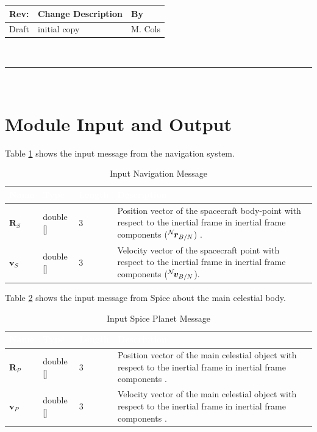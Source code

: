 \documentclass[]{AVSSimReportMemo}
\begin{document}
\makeCover


%
%
\pagestyle{empty}
{\renewcommand{\arraystretch}{2}
\noindent
\begin{longtable}{|p{0.5in}|p{4.5in}|p{1.14in}|}
\hline
{\bfseries Rev}: & {\bfseries Change Description} & {\bfseries By} \\
\hline
Draft & initial copy & M. Cols \\
\hline

\end{longtable}
}

\newpage
\setcounter{page}{1}
\pagestyle{fancy}

\tableofcontents
~\\ \hrule ~\\

\section{Module Input and Output}
Table \ref{tab:inputNavTable} shows the input message from the navigation system.
\begin{table}[h!]
	\centering
	\caption{Input Navigation Message}
	\begin{tabular}{|l|l|l|p{3in}|}
		\hline
		\rowcolor{BrickRed}
		\textcolor{white}{Name} & \textcolor{white}{Type} & 
		\textcolor{white}{Length} & 
		\textcolor{white}{Description}  \\ \hline
		$\bm{R}_S$ & double [] & 3 & 
		Position vector of the spacecraft body-point with respect to the inertial frame in inertial frame components 
		($\leftexp{N}{\bm{r}}_{B/N}$) . \\ \hline
		$\bm{v}_S$ & double [] & 3 & 
		Velocity vector of the spacecraft point with respect to the inertial frame in inertial frame components 
		($\leftexp{N}{\bm{v}}_{B/N}$). \\ \hline
	\end{tabular}
	\label{tab:inputNavTable}
\end{table}

Table \ref{tab:inputCelTable} shows the input message from Spice about the main celestial body.
\begin{table}[h!]
	\centering
	\caption{Input Spice Planet Message}
	\begin{tabular}{|l|l|l|p{3in}|}
		\hline
		\rowcolor{BrickRed}
		\textcolor{white}{Name} & \textcolor{white}{Type} & 
		\textcolor{white}{Length} & 
		\textcolor{white}{Description}  \\ \hline
		$\bm{R}_P$  & double [] & 3 & 
		Position vector of the main celestial object with respect to the inertial frame in inertial frame components . \\ \hline
		$\bm{v}_P$  & double [] & 3 & 
		Velocity vector of the main celestial object with respect to the inertial frame in inertial frame components . \\ \hline
	\end{tabular}
	\label{tab:inputCelTable}
\end{table}
\end{document}
